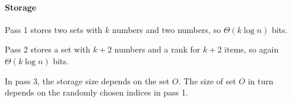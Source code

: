 \paragraph{Storage}
Pass 1 stores two sets with $k$ numbers and two numbers, so $\Theta(k\log{n})$ bits.

Pass 2 stores a set with $k+2$ numbers and a rank for $k+2$ items, so again $\Theta(k\log{n})$ bits.

In pass 3, the storage size depends on the set $O$.
The size of set $O$ in turn depends on the randomly chosen indices in pass 1.
